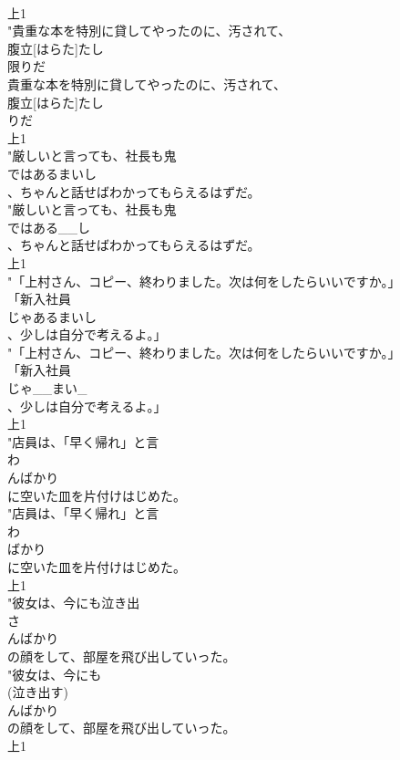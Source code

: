 \documentclass[8pt]{extreport}
\begin{document}
\begin{CJK}{UTF8}{min}
\\	上1
\\	"貴重な本を特別に貸してやったのに、汚されて、
\\	腹立[はらた]たし
\\	限りだ
\\	貴重な本を特別に貸してやったのに、汚されて、
\\	腹立[はらた]たし
\\	りだ
\\	上1
\\	"厳しいと言っても、社長も鬼
\\	ではあるまいし
\\	、ちゃんと話せばわかってもらえるはずだ。
\\	"厳しいと言っても、社長も鬼
\\	ではある__し
\\	、ちゃんと話せばわかってもらえるはずだ。
\\	上1
\\	"「上村さん、コピー、終わりました。次は何をしたらいいですか。」
\\	「新入社員
\\	じゃあるまいし
\\	、少しは自分で考えるよ。」
\\	"「上村さん、コピー、終わりました。次は何をしたらいいですか。」
\\	「新入社員
\\	じゃ__まい_
\\	、少しは自分で考えるよ。」
\\	上1
\\	"店員は、「早く帰れ」と言
\\	わ
\\	んばかり
\\	に空いた皿を片付けはじめた。
\\	"店員は、「早く帰れ」と言
\\	わ
\\	ばかり
\\	に空いた皿を片付けはじめた。
\\	上1
\\	"彼女は、今にも泣き出
\\	さ
\\	んばかり
\\	の顔をして、部屋を飛び出していった。
\\	"彼女は、今にも
\\	(泣き出す)
\\	んばかり
\\	の顔をして、部屋を飛び出していった。
\\	上1

\end{CJK}
\end{document}
